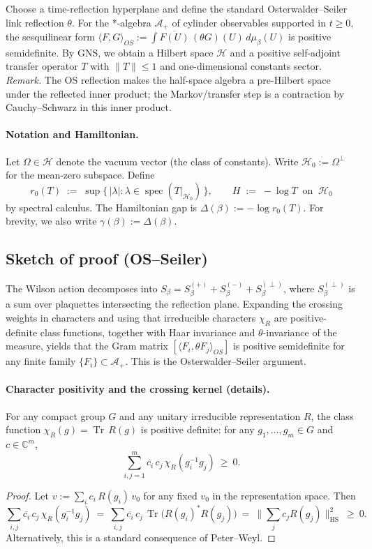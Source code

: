 \documentclass[11pt]{amsart}
\begin{document}
Choose a time-reflection hyperplane and define the standard Osterwalder--Seiler link reflection $\theta$. For the *-algebra $\mathcal A_+$ of cylinder observables supported in $t\ge 0$, the sesquilinear form $\langle F,G\rangle_{OS}:=\int \overline{F(U)}\,(\theta G)(U)\, d\mu_{\beta}(U)$ is positive semidefinite. By GNS, we obtain a Hilbert space $\mathcal H$ and a positive self-adjoint transfer operator $T$ with $\lVert T\rVert\le 1$ and one-dimensional constants sector.
\smallskip
\noindent\emph{Remark.} The OS reflection makes the half-space algebra a pre-Hilbert space under the reflected inner product; the Markov/transfer step is a contraction by Cauchy–Schwarz in this inner product.

\paragraph{Notation and Hamiltonian.}
Let $\Omega\in\mathcal H$ denote the vacuum vector (the class of constants). Write $\mathcal H_0:=\Omega^{\perp}$ for the mean-zero subspace. Define
\[
  r_0(T)\;:=\; \sup\{\,|\lambda| : \lambda\in\operatorname{spec}(T|_{\mathcal H_0})\,\},\qquad
  H\;:=\;-\log T\ \text{ on }\ \mathcal H_0
\]
by spectral calculus. The Hamiltonian gap is $\Delta(\beta):=-\log r_0(T)$.
For brevity, we also write $\gamma(\beta):=\Delta(\beta)$.

\subsection*{Sketch of proof (OS--Seiler)}
The Wilson action decomposes into $S_\beta=S_\beta^{(+)}+S_\beta^{(-)}+S_\beta^{(\perp)}$, where $S_\beta^{(\perp)}$ is a sum over plaquettes intersecting the reflection plane. Expanding the crossing weights in characters and using that irreducible characters $\chi_R$ are positive-definite class functions, together with Haar invariance and $\theta$-invariance of the measure, yields that the Gram matrix $[\langle F_i,\theta F_j\rangle_{OS}]$ is positive semidefinite for any finite family $\{F_i\}\subset \mathcal A_+$. This is the Osterwalder--Seiler argument.

\paragraph{Character positivity and the crossing kernel (details).}
\begin{lemma}\label{lem:char-pd}
For any compact group $G$ and any unitary irreducible representation $R$, the class function $\chi_R(g)=\operatorname{Tr}\,R(g)$ is positive definite: for any $g_1,\dots,g_m\in G$ and $c\in\mathbb C^m$,
\[
  \sum_{i,j=1}^m \overline{c_i}\,c_j\,\chi_R(g_i^{-1} g_j)\ \ge\ 0.
\]
\end{lemma}
\begin{proof}
Let $v:=\sum_i c_i\,R(g_i)\,v_0$ for any fixed $v_0$ in the representation space. Then
\[
  \sum_{i,j}\overline{c_i}\,c_j\,\chi_R(g_i^{-1} g_j)\ =\ \sum_{i,j}\overline{c_i}\,c_j\,\operatorname{Tr}\big(R(g_i)^{*}R(g_j)\big)\ =\ \|\sum_j c_j R(g_j)\|_{\mathrm{HS}}^2\ \ge\ 0.
\]
Alternatively, this is a standard consequence of Peter–Weyl.
\end{proof}
\end{document}
